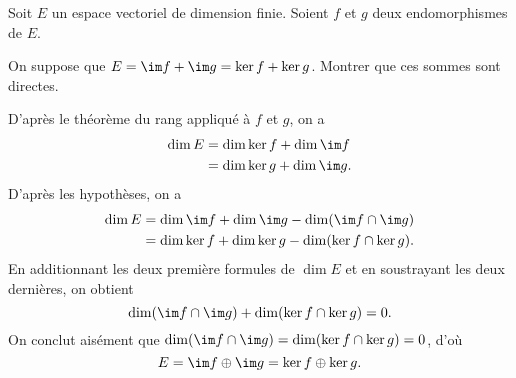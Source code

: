 \begin{enonce}
\begin{exercise}[ID={RMS113/4 E417 CCP},subtitle={},tags={}]
Soit $E$ un espace vectoriel de dimension finie.
Soient $f$ et $g$ deux endomorphismes de $E$.

On suppose que $E=\im f+\im g=\ker f+\ker g$.
Montrer que ces sommes sont directes.
\end{exercise}
\begin{solution}
D'après le théorème du rang appliqué à $f$ et $g$, on a
\begin{align*}
\dim E
&=\dim \ker f+\dim \im f\\
&=\dim \ker g+\dim \im g.
\end{align*}
D'après les hypothèses, on a
\begin{align*}
\dim E
&= \dim \im f+\dim \im g -\dim(\im f\cap\im g)\\
&= \dim \ker f+\dim \ker g -\dim(\ker f\cap\ker g).
\end{align*}
En additionnant les deux première formules de $\dim E$ et en soustrayant les deux dernières, on obtient
\begin{equation*}
    \dim (\im f\cap\im g)+\dim(\ker f\cap\ker g)=0.
\end{equation*}
On conclut aisément que $\dim (\im f\cap\im g)=\dim(\ker f\cap\ker g)=0$, d'où
\begin{equation*}
    E=\im f\oplus\im g=\ker f\oplus\ker g.
\end{equation*}
\end{solution}
\end{enonce}
